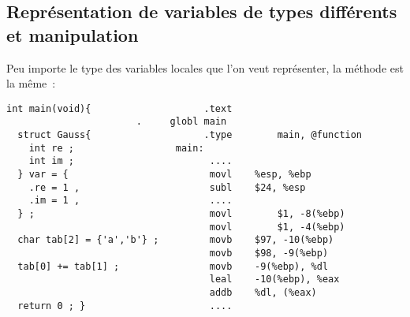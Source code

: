 \begin{frame}
  \section{Repr\'esentation de variables de types diff\'erents et manipulation}%
        Peu importe le type des variables locales que l'on veut repr\'esenter,
        la m\'ethode est la m\^eme~:
        \par\bigskip
\begin{verbatim}
int main(void){                    .text                           
                       .     globl main                    
  struct Gauss{                    .type        main, @function    
    int re ;                  main:                                
    int im ;                        ....                           
  } var = {                         movl    %esp, %ebp     
    .re = 1 ,                       subl    $24, %esp      
    .im = 1 ,                       ....                           
  } ;                               movl        $1, -8(%ebp)       
                                    movl        $1, -4(%ebp)
  char tab[2] = {'a','b'} ;         movb    $97, -10(%ebp)
                                    movb    $98, -9(%ebp)
  tab[0] += tab[1] ;                movb    -9(%ebp), %dl
                                    leal    -10(%ebp), %eax
                                    addb    %dl, (%eax)
  return 0 ; }                      ....                       
\end{verbatim}
\end{frame}
